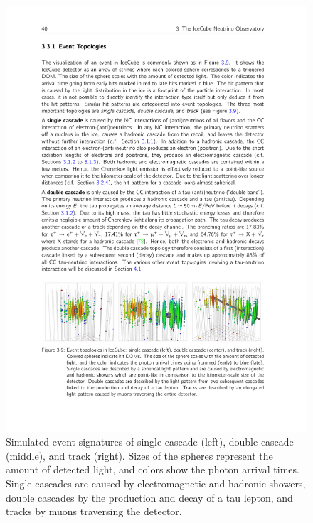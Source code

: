 \begin{figure}
	\centering \includegraphics{./figures/nu_in_icecube/topologies.pdf}
	\caption{Simulated event signatures of single cascade (left), double cascade (middle), and track (right). Sizes of the spheres represent the amount of detected light, and colors show the photon arrival times. Single cascades are caused by electromagnetic and hadronic showers, double cascades by the production and decay of a tau lepton, and tracks by muons traversing the detector.}
\end{figure}

